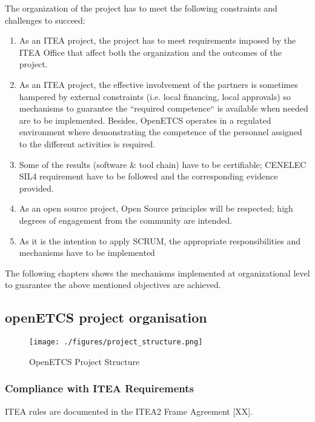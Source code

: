 \documentclass{template/openetcs_article}
\begin{document}
The organization of the project has to meet the following constraints and challenges to succeed:

\begin{enumerate}
\item As an ITEA project, the project has to meet requirements imposed by the ITEA Office that affect both the organization and the outcomes of the project.
\item As an ITEA project, the effective involvement of the partners is sometimes hampered by external constraints (i.e. local financing, local approvals) so mechanisms to guarantee the “required competence“ is available when needed are to be implemented. Besides, OpenETCS operates in a regulated environment where demonstrating the competence of the personnel assigned to the different activities is required. 
\item Some of the results (software \& tool chain) have to be certifiable; CENELEC SIL4 requirement \citep{subset026} have to be followed and the corresponding evidence provided. 
\item As an open source project, Open Source principles will be respected; high degrees of engagement from the community are intended.
\item As it is the intention to apply SCRUM, the appropriate responsibilities and mechanisms have to be implemented
\end{enumerate}

The following chapters shows the mechanisms implemented at organizational level to guarantee the above mentioned objectives are achieved.


\subsection{openETCS project organisation}

\begin{figure}[H]
\centering
\texttt{[image: ./figures/project\_structure.png]}
\caption{OpenETCS Project Structure}
\end{figure}

\subsubsection{Compliance with ITEA Requirements}
ITEA rules are documented in the ITEA2 Frame Agreement [XX].
\end{document}
